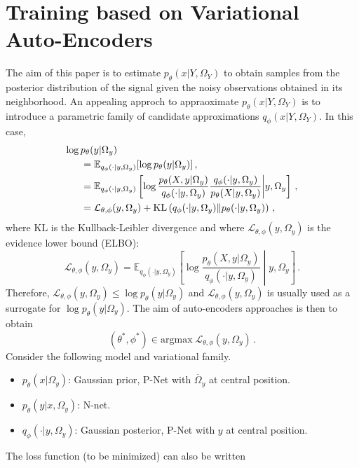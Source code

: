 \documentclass[review]{cvpr}
\begin{document}
\section{Training based on Variational Auto-Encoders}
The aim of this paper is to estimate $p_{\theta}(x|Y,\Omega_Y)$ to obtain samples from the posterior distribution of the signal given the noisy observations obtained in its neighborhood. An appealing approch to appraoximate $p_{\theta}(x|Y,\Omega_Y)$  is to introduce a parametric family of candidate approximations $q_{\phi}(x|Y,\Omega_Y)$. In this case,
\begin{align*}
\log p_{\theta}(y|\Omega_y) &\\
&\hspace{-1.3cm}= \mathbb{E}_{q_{\phi}(\cdot|y,\Omega_y)}[\log p_{\theta}(y|\Omega_y)]\,,\\
&\hspace{-1.3cm}= \mathbb{E}_{q_{\phi}(\cdot|y,\Omega_y)}\left[\log \frac{p_\theta(X,y|\Omega_y)}{q_{\phi}(\cdot|y,\Omega_y)}\frac{q_{\phi}(\cdot|y,\Omega_y)}{p_\theta(X|y,\Omega_y)}\middle |y,\Omega_y\right]\,,\\
&\hspace{-1.3cm}= \mathcal{L}_{\theta,\phi}(y,\Omega_y) + \mathrm{KL}\left(q_{\phi}(\cdot|y,\Omega_y)\| p_\theta(\cdot|y,\Omega_y)\right)\,,
\end{align*}
where $ \mathrm{KL}$ is the Kullback-Leibler divergence and where $\mathcal{L}_{\theta,\phi}(y,\Omega_y)$ is the evidence lower bound (ELBO):
$$
 \mathcal{L}_{\theta,\phi}(y,\Omega_y)  = \mathbb{E}_{q_{\phi}(\cdot|y,\Omega_y)}\left[\log \frac{p_\theta(X,y|\Omega_y)}{q_{\phi}(\cdot|y,\Omega_y)}\middle |y,\Omega_y\right]\,.
$$
Therefore, $ \mathcal{L}_{\theta,\phi}(y,\Omega_y) \leqslant \log p_{\theta}(y|\Omega_y)$ and $ \mathcal{L}_{\theta,\phi}(y,\Omega_y)$ is usually used as a surrogate for $ \log p_{\theta}(y|\Omega_y)$. The aim of auto-encoders approaches is then to obtain
$$
(\theta^*,\phi^*) \in \mathrm{argmax} \; \mathcal{L}_{\theta,\phi}(y,\Omega_y)\,.
$$ 
Consider the following model and variational family.
\begin{itemize}
\item $p_\theta(x|\Omega_y)$: Gaussian prior, P-Net with $\overline \Omega_y$ at central position.
\item $p_\theta(y|x,\Omega_y)$: N-net.
\item $q_{\phi}(\cdot|y,\Omega_y)$: Gaussian posterior, P-Net with $y$ at central position.
\end{itemize}
The loss function (to be minimized) can also be written
\end{document}

